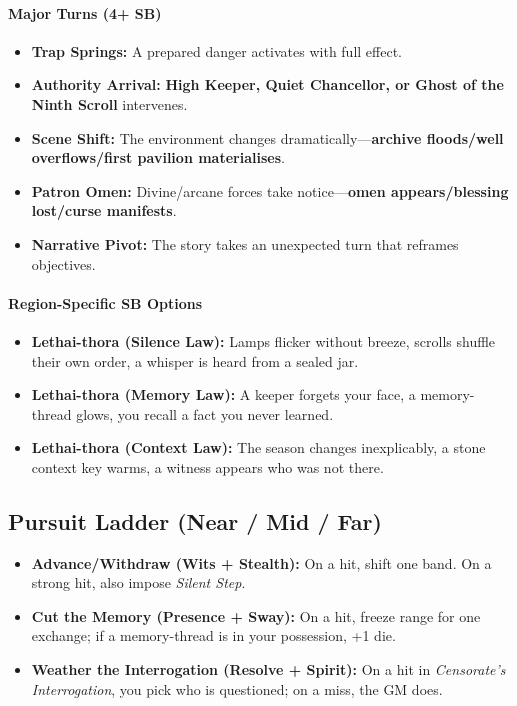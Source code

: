 \paragraph{Major Turns (4+ SB)}
\begin{itemize}
\item \textbf{Trap Springs:} A prepared danger activates with full effect.
\item \textbf{Authority Arrival:} \textbf{High Keeper, Quiet Chancellor, or Ghost of the Ninth Scroll} intervenes.
\item \textbf{Scene Shift:} The environment changes dramatically---\textbf{archive floods/well overflows/first pavilion materialises}.
\item \textbf{Patron Omen:} Divine/arcane forces take notice---\textbf{omen appears/blessing lost/curse manifests}.
\item \textbf{Narrative Pivot:} The story takes an unexpected turn that reframes objectives.
\end{itemize}

\paragraph{Region-Specific SB Options}
\begin{itemize}
\item \textbf{Lethai-thora (Silence Law):} Lamps flicker without breeze, scrolls shuffle their own order, a whisper is heard from a sealed jar.
\item \textbf{Lethai-thora (Memory Law):} A keeper forgets your face, a memory-thread glows, you recall a fact you never learned.
\item \textbf{Lethai-thora (Context Law):} The season changes inexplicably, a stone context key warms, a witness appears who was not there.
\end{itemize}

\subsection*{Pursuit Ladder (Near / Mid / Far)}
\begin{itemize}
\item \textbf{Advance/Withdraw (Wits + Stealth):} On a hit, shift one band. On a strong hit, also impose \textit{Silent Step}.
\item \textbf{Cut the Memory (Presence + Sway):} On a hit, freeze range for one exchange; if a memory-thread is in your possession, +1 die.
\item \textbf{Weather the Interrogation (Resolve + Spirit):} On a hit in \textit{Censorate's Interrogation}, you pick who is questioned; on a miss, the GM does.
\end{itemize}

